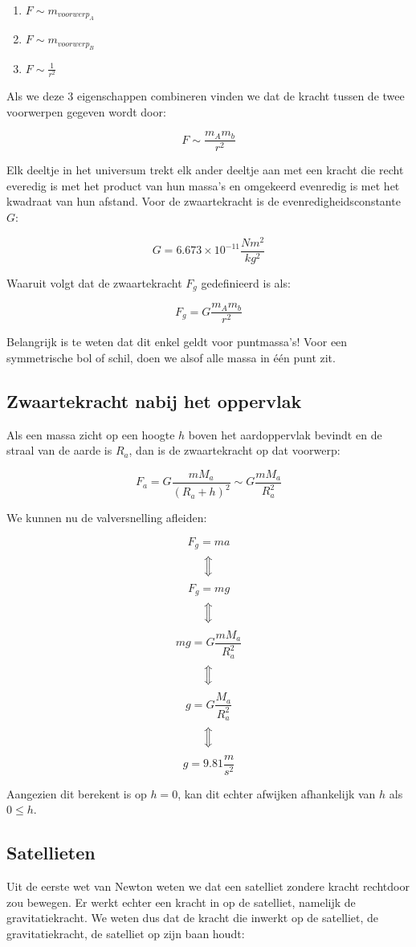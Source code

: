 \documentclass[12pt,a4paper]{article}
\newcommand{\Luda}{\Big\Updownarrow}
\begin{document}
    \begin{enumerate}
    	\item $F \sim m_{voorwerp_{A}}$
    	\item $F \sim m_{voorwerp_{B}}$
    	\item $F \sim \frac{1}{r^{2}}$
    \end{enumerate}
    
    Als we deze 3 eigenschappen combineren vinden we dat de kracht tussen de twee voorwerpen gegeven wordt door:
    
    $$ F \sim \frac{m_{A}m_{b}}{r^{2}} $$

    Elk deeltje in het universum trekt elk ander deeltje aan met een kracht die recht everedig is met het product van hun massa's en omgekeerd
    evenredig is met het kwadraat van hun afstand. Voor de zwaartekracht is de evenredigheidsconstante $G$:
    
    $$ G = 6.673 \times 10^{-11} \frac{Nm^{2}}{kg^{2}} $$ 
    
    Waaruit volgt dat de zwaartekracht $F_{g}$ gedefinieerd is als:
    
    $$ F_{g} = G \frac{m_{A}m_{b}}{r^{2}} $$ 
    
    Belangrijk is te weten dat dit enkel geldt voor puntmassa's! Voor een symmetrische bol of schil, 
    doen we alsof alle massa in één punt zit.
    
    \subsection{Zwaartekracht nabij het oppervlak}
    Als een massa zicht op een hoogte $h$ boven het aardoppervlak bevindt en de straal van de aarde is $R_{a}$, dan is de zwaartekracht op dat voorwerp:
    
    $$ F_{a} = G\frac{mM_{a}}{(R_{a} + h)^{2}} \sim G\frac{mM_{a}}{R_{a}^{2}}$$
    
    We kunnen nu de valversnelling afleiden:
    
    $$ F_{g} = ma $$
    $$\Luda$$
    $$ F_{g} = mg $$
    $$\Luda$$
    $$ mg = G\frac{mM_{a}}{R_{a}^{2}}$$
    $$\Luda$$
    $$ g = G\frac{M_{a}}{R_{a}^{2}} $$
    $$\Luda$$
    $$ g = 9.81 \frac{m}{s^{2}} $$
    
    Aangezien dit berekent is op $h = 0$, kan dit echter afwijken afhankelijk van $h$ als $0 \leq h$. 
    
    \subsection{Satellieten}
    Uit de eerste wet van Newton weten we dat een satelliet zondere kracht rechtdoor zou bewegen. Er werkt echter een kracht in
    op de satelliet, namelijk de gravitatiekracht. We weten dus dat de kracht die inwerkt op de satelliet, de gravitatiekracht, de satelliet
    op zijn baan houdt:
    
\end{document}
